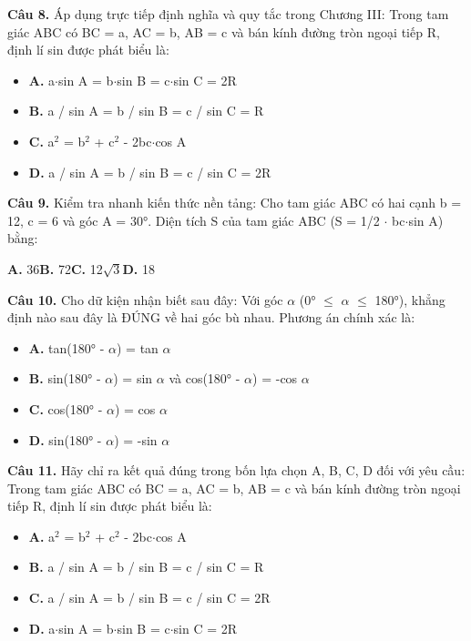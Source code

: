 \documentclass[11pt,a4paper]{article}
\begin{document}
\textbf{\color{primary} Câu 8.} Áp dụng trực tiếp định nghĩa và quy tắc trong Chương III: Trong tam giác ABC có BC = a, AC = b, AB = c và bán kính đường tròn ngoại tiếp R, định lí sin được phát biểu là:\par
\begin{itemize}\setlength{\itemsep}{1pt}\setlength{\parskip}{0pt}
  \item[] \textbf{A.} a$\cdot$sin A = b$\cdot$sin B = c$\cdot$sin C = 2R
  \item[] \textbf{B.} a / sin A = b / sin B = c / sin C = R
  \item[] \textbf{C.} a$^2$ = b$^2$ + c$^2$ - 2bc$\cdot$cos A
  \item[] \textbf{D.} a / sin A = b / sin B = c / sin C = 2R
\end{itemize}\vspace{2pt}
\textbf{\color{primary} Câu 9.} Kiểm tra nhanh kiến thức nền tảng: Cho tam giác ABC có hai cạnh b = 12, c = 6 và góc A = 30°. Diện tích S của tam giác ABC (S = 1/2 $\cdot$ bc$\cdot$sin A) bằng:\par
\hspace*{1.5em}\textbf{A.} 36\quad\quad \textbf{B.} 72\quad\quad \textbf{C.} 12$\sqrt{3}$\quad\quad \textbf{D.} 18\par\vspace{2pt}
\textbf{\color{primary} Câu 10.} Cho dữ kiện nhận biết sau đây: Với góc $\alpha$ (0° $\le$ $\alpha$ $\le$ 180°), khẳng định nào sau đây là ĐÚNG về hai góc bù nhau. Phương án chính xác là:\par
\begin{itemize}\setlength{\itemsep}{1pt}\setlength{\parskip}{0pt}
  \item[] \textbf{A.} tan(180° - $\alpha$) = tan $\alpha$
  \item[] \textbf{B.} sin(180° - $\alpha$) = sin $\alpha$ và cos(180° - $\alpha$) = -cos $\alpha$
  \item[] \textbf{C.} cos(180° - $\alpha$) = cos $\alpha$
  \item[] \textbf{D.} sin(180° - $\alpha$) = -sin $\alpha$
\end{itemize}\vspace{2pt}
\textbf{\color{primary} Câu 11.} Hãy chỉ ra kết quả đúng trong bốn lựa chọn A, B, C, D đối với yêu cầu: Trong tam giác ABC có BC = a, AC = b, AB = c và bán kính đường tròn ngoại tiếp R, định lí sin được phát biểu là:\par
\begin{itemize}\setlength{\itemsep}{1pt}\setlength{\parskip}{0pt}
  \item[] \textbf{A.} a$^2$ = b$^2$ + c$^2$ - 2bc$\cdot$cos A
  \item[] \textbf{B.} a / sin A = b / sin B = c / sin C = R
  \item[] \textbf{C.} a / sin A = b / sin B = c / sin C = 2R
  \item[] \textbf{D.} a$\cdot$sin A = b$\cdot$sin B = c$\cdot$sin C = 2R
\end{itemize}\vspace{2pt}
\end{document}

